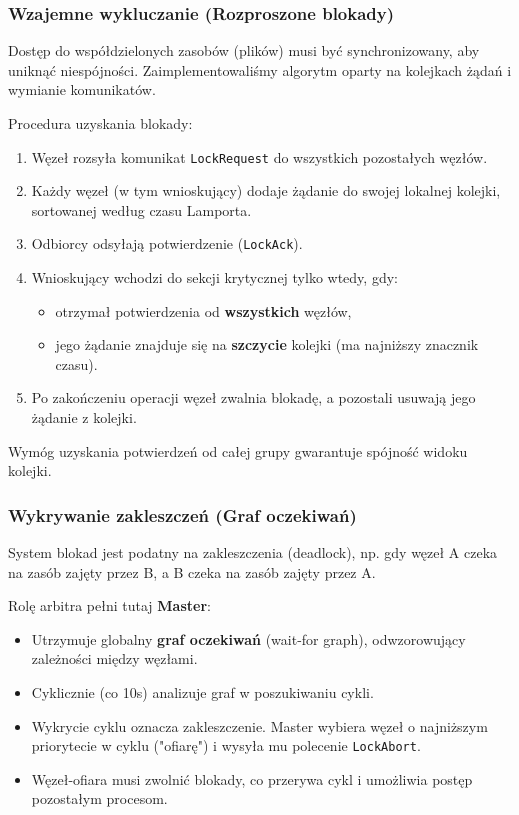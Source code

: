 \documentclass[12pt,a4paper]{article}
\begin{document}
	\subsubsection{Wzajemne wykluczanie (Rozproszone blokady)}
	Dostęp do współdzielonych zasobów (plików) musi być synchronizowany, aby uniknąć niespójności. Zaimplementowaliśmy algorytm oparty na kolejkach żądań i wymianie komunikatów.
	
	Procedura uzyskania blokady:
	\begin{enumerate}
		\item Węzeł rozsyła komunikat \texttt{LockRequest} do wszystkich pozostałych węzłów.
		\item Każdy węzeł (w tym wnioskujący) dodaje żądanie do swojej lokalnej kolejki, sortowanej według czasu Lamporta.
		\item Odbiorcy odsyłają potwierdzenie (\texttt{LockAck}).
		\item Wnioskujący wchodzi do sekcji krytycznej tylko wtedy, gdy:
		\begin{itemize}
			\item otrzymał potwierdzenia od \textbf{wszystkich} węzłów,
			\item jego żądanie znajduje się na \textbf{szczycie} kolejki (ma najniższy znacznik czasu).
		\end{itemize}
		\item Po zakończeniu operacji węzeł zwalnia blokadę, a pozostali usuwają jego żądanie z kolejki.
	\end{enumerate}
	Wymóg uzyskania potwierdzeń od całej grupy gwarantuje spójność widoku kolejki.

	\subsubsection{Wykrywanie zakleszczeń (Graf oczekiwań)}
	System blokad jest podatny na zakleszczenia (deadlock), np. gdy węzeł A czeka na zasób zajęty przez B, a B czeka na zasób zajęty przez A.
	
	Rolę arbitra pełni tutaj \textbf{Master}:
	\begin{itemize}
		\item Utrzymuje globalny \textbf{graf oczekiwań} (wait-for graph), odwzorowujący zależności między węzłami.
		\item Cyklicznie (co 10s) analizuje graf w poszukiwaniu cykli.
		\item Wykrycie cyklu oznacza zakleszczenie. Master wybiera węzeł o najniższym priorytecie w cyklu ("ofiarę") i wysyła mu polecenie \texttt{LockAbort}.
		\item Węzeł-ofiara musi zwolnić blokady, co przerywa cykl i umożliwia postęp pozostałym procesom.
	\end{itemize}
\end{document}
